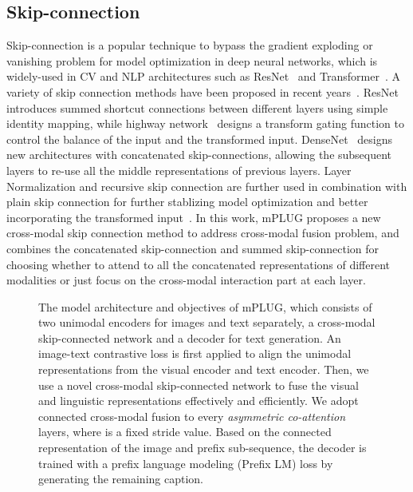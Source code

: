 \documentclass[11pt]{article}
\begin{document}
\subsection{Skip-connection}
Skip-connection is a popular technique to bypass the gradient exploding or vanishing problem for model optimization in deep neural networks, which is widely-used in CV and NLP architectures such as ResNet~\cite{he2016deep} and Transformer~\cite{vaswani2017attention}. A variety of skip connection methods have been proposed in recent years~\cite{srivastava2015highway,he2016deep,vaswani2017attention,huang2017densely,szegedy2017inception,liu2021rethinking}. ResNet~\cite{he2016deep} introduces summed shortcut connections between different layers using simple identity mapping, while highway network~\cite{srivastava2015highway} designs a transform gating function to control the balance of the input and the transformed input. DenseNet~\cite{huang2017densely} designs new architectures with concatenated skip-connections, allowing the subsequent layers to re-use all the middle representations of previous layers. Layer Normalization and recursive skip connection are further used in combination with plain skip connection for further stablizing model optimization and better incorporating the transformed input~\cite{vaswani2017attention,liu2021rethinking}. In this work, mPLUG proposes a new cross-modal skip connection method to address cross-modal fusion problem, and combines the concatenated skip-connection and summed skip-connection for choosing whether to attend to all the concatenated representations of different modalities or just focus on the cross-modal interaction part at each layer. 



\begin{figure*}
     \centering
     \caption{The model architecture and objectives of mPLUG, which consists of two unimodal encoders for images and text separately, a cross-modal skip-connected network and a decoder for text generation. An image-text contrastive loss is first applied to align the unimodal representations from the visual encoder and text encoder. Then, we use a novel cross-modal skip-connected network to fuse the visual and linguistic representations effectively and efficiently. We adopt connected cross-modal fusion to every  \textit{asymmetric co-attention} layers, where  is a fixed stride value. Based on the connected representation of the image and prefix sub-sequence, the decoder is trained with a prefix language modeling (Prefix LM) loss by generating the remaining caption.}
     \label{fig:framework}
\end{figure*}
\end{document}
